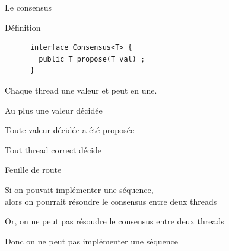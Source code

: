 
\begingroup

\begin{frame}[fragile]{Le consensus}

  \begin{block}{Définition}
    \begin{lstlisting}
      interface Consensus<T> {
        public T propose(T val) ;
      }
    \end{lstlisting}
    Chaque thread  une valeur et peut en  une.
    \begin{description}
    \item[Accord : ] Au plus une valeur décidée
    \item[Validité : ] Toute valeur décidée a été proposée
    \item[Wait-freedom : ] Tout thread correct décide
    \end{description}
  \end{block}

  \pause

  \begin{exampleblock}{Feuille de route}
    \begin{description}[Thm1 :]
    \item[Thm1 :] Si on pouvait implémenter une séquence, \\ \hspace{5mm} alors on pourrait résoudre le consensus {\color{exampleColor}entre deux threads}
    \item[Thm2 :] Or, on ne peut pas résoudre le consensus entre deux threads
    \item[Conc :] Donc on ne peut pas implémenter une séquence
    \end{description}
  \end{exampleblock}

\end{frame}

\endgroup
\endinput
